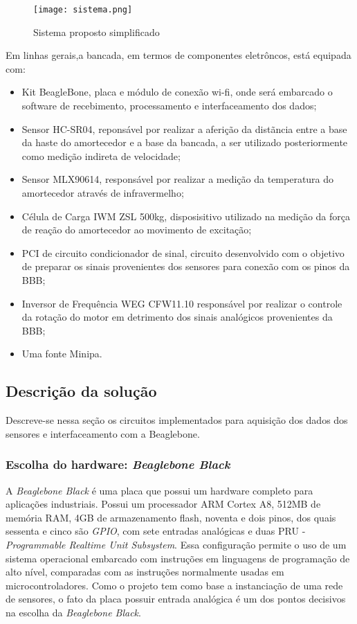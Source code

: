 	\begin{figure}[!h]
		\centering
		\texttt{[image: sistema.png]}
		\caption{Sistema proposto simplificado}
		\label{sistema}
	\end{figure}

	Em linhas gerais,a bancada, em termos de componentes eletrôncos, está equipada com:

	\begin{itemize}

	\item Kit BeagleBone, placa e módulo de conexão wi-fi, onde será embarcado o software de recebimento, processamento e interfaceamento dos dados;
	\item Sensor HC-SR04, reponsável por realizar a aferição da distãncia entre a base da haste do amortecedor e a base da bancada, a ser utilizado posteriormente como medição indireta de velocidade;
	\item Sensor MLX90614, responsável por realizar a medição da temperatura do amortecedor através de infravermelho;
	\item Célula de Carga IWM ZSL 500kg, disposisitivo utilizado na medição da força de reação do amortecedor ao movimento de excitação;
	\item PCI de circuito condicionador de sinal, circuito desenvolvido com o objetivo de preparar os sinais provenientes dos sensores para conexão com os pinos da BBB;
	\item Inversor de Frequência WEG CFW11.10 responsável por realizar o controle da rotação do motor em detrimento dos sinais analógicos provenientes da BBB;
	\item Uma fonte Minipa.
	\end{itemize}	

\subsection{Descrição da solução}
	
	Descreve-se nessa seção os circuitos implementados para aquisição dos dados dos sensores e interfaceamento com a Beaglebone.

	\subsubsection{Escolha do hardware: \emph{Beaglebone Black}}
	A \emph{Beaglebone Black} é uma placa que possui um hardware completo para aplicações industriais. Possui um processador ARM Cortex A8, 512MB de memória RAM, 4GB de armazenamento flash, noventa e dois pinos, dos quais sessenta e cinco são \emph{GPIO}, com sete entradas analógicas e duas PRU - \emph{Programmable Realtime Unit Subsystem}. Essa configuração permite o uso de um sistema operacional embarcado com instruções em linguagens de programação de alto nível, comparadas com as instruções normalmente usadas em microcontroladores. Como o projeto tem como base a instanciação de uma rede de sensores, o fato da placa possuir entrada analógica é um dos pontos decisivos na escolha da \emph{Beaglebone Black}.

